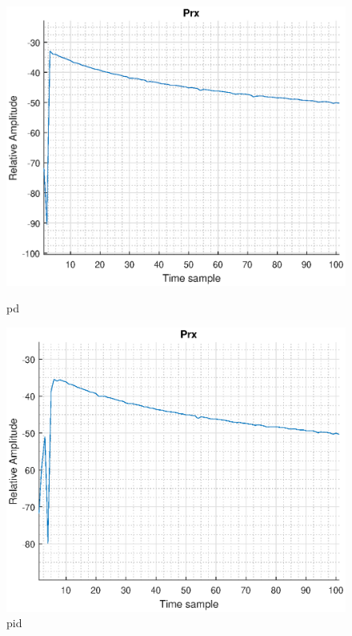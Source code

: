 \begin{figure}[H]
\vspace*{0.5cm} %
\begin{minipage}[t]{0.45\textwidth}
\includegraphics[width=\linewidth]{figures/s2_pd_prx.eps}
\caption{pd}
\label{fig:s2_pd_prx}
\end{minipage}
\hspace{\fill}
\begin{minipage}[t]{0.45\textwidth}
\includegraphics[width=\linewidth]{figures/s2_pid_prx.eps}
\caption{pid}
\label{fig:s2_pid_prx}
\end{minipage}

\end{figure}

